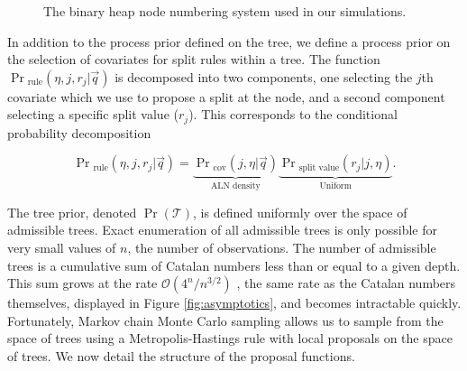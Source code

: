   \begin{figure}
  \begin{center}

\caption{The binary heap node numbering system used in our simulations. }
\label{fig:tree_node_nums}  
\end{center}
\end{figure}
In addition to the process prior defined on the tree, we define a process prior on the selection of covariates for split rules within a tree. The function $\Pr{_{\text{rule}}}(\eta,j,r_j \vert \vec{q} )$ is decomposed into two components, one selecting the $j$th covariate which we use to propose a split at the node, and a second component selecting a specific split value ($r_j$). This corresponds to the conditional probability decomposition 

\begin{equation}\label{eqn:decomp}
\Pr{_\text{rule}}(\eta,j,r_j\vert \vec{q}) = \underbrace{\Pr{_\text{cov}}(j,\eta \vert \vec{q})}_{\text{ALN density}} \underbrace{\Pr{_\text{split value}}(r_j \vert j, \eta)}_{\text{Uniform}}.
\end{equation}

\noindent The tree prior, denoted $\Pr(\mathcal{T})$, is defined uniformly over the space of admissible trees. Exact enumeration of all admissible trees is only possible for very small values of $n$, the number of observations. The number of admissible trees is a cumulative sum of Catalan numbers less than or equal to a given depth. This sum grows at the rate $\mathcal{O}(4^n/n^{3/2})$ \cite{mattarei2009asymptotics}, the same rate as the Catalan numbers themselves, displayed in Figure \ref{fig:asymptotics}, and becomes intractable quickly. Fortunately, Markov chain Monte Carlo sampling allows us to sample from the space of trees using a Metropolis-Hastings rule with local proposals on the space of trees. We now detail the structure of the proposal functions. 

